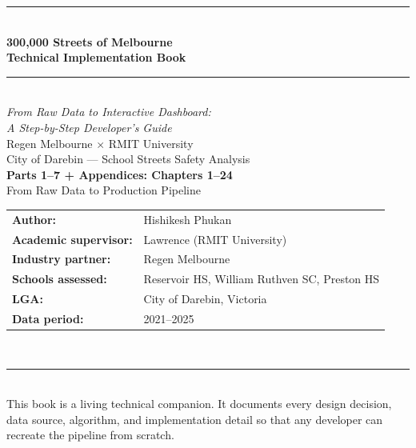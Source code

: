 \documentclass[11pt,a4paper,openany]{book}
\begin{document}
\begin{titlepage}
\centering
\vspace*{2cm}
{\color{navyblue}\rule{\linewidth}{2pt}}\\[0.6cm]
{\Huge\bfseries\color{navyblue}
  300,000 Streets of Melbourne\\[0.3cm]
  Technical Implementation Book}\\[0.5cm]
{\color{regengreen}\rule{\linewidth}{1pt}}\\[0.5cm]
{\Large\itshape From Raw Data to Interactive Dashboard:\\
A Step-by-Step Developer's Guide}\\[1.5cm]
{\large
  Regen Melbourne $\times$ RMIT University\\[0.3cm]
  City of Darebin --- School Streets Safety Analysis\\[1.5cm]
  \textbf{Parts 1--7 + Appendices: Chapters 1--24}\\[0.3cm]
  From Raw Data to Production Pipeline\\[2cm]
}
{\normalsize
  \begin{tabular}{ll}
    \textbf{Author:}              & Hishikesh Phukan \\
    \textbf{Academic supervisor:} & Lawrence (RMIT University) \\
    \textbf{Industry partner:}    & Regen Melbourne \\
    \textbf{Schools assessed:}    & Reservoir HS, William Ruthven SC, Preston HS \\
    \textbf{LGA:}                 & City of Darebin, Victoria \\
    \textbf{Data period:}         & 2021--2025 \\
  \end{tabular}
}\\[2cm]
{\color{navyblue}\rule{\linewidth}{2pt}}\\[0.3cm]
{\small\color{codegray}
  This book is a living technical companion. It documents every design decision,
  data source, algorithm, and implementation detail so that any developer can
  recreate the pipeline from scratch.
}
\end{titlepage}

\frontmatter
\tableofcontents
\clearpage
\end{document}
